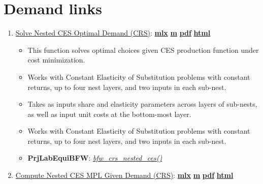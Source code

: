 \documentclass[
]{book}
\providecommand{\tightlist}{%
  \setlength{\itemsep}{0pt}\setlength{\parskip}{0pt}}
\begin{document}
\hypertarget{demand-links}{%
\section{Demand links}\label{demand-links}}

\begin{enumerate}
\def\labelenumi{\arabic{enumi}.}
\tightlist
\item
  \href{https://fanwangecon.github.io/PrjLabEquiBFW/PrjLabEquiBFW/doc/solvedemand/htmlpdfm/bfwx_crs_nested_ces.html}{Solve Nested CES Optimal Demand (CRS)}: \href{https://github.com/FanWangEcon/PrjLabEquiBFW/blob/main/PrjLabEquiBFW/doc/solvedemand/bfwx_crs_nested_ces.mlx}{\textbf{mlx}} \textbar{} \href{https://github.com/FanWangEcon/PrjLabEquiBFW/blob/main/PrjLabEquiBFW/doc/solvedemand/htmlpdfm/bfwx_crs_nested_ces.m}{\textbf{m}} \textbar{} \href{https://github.com/FanWangEcon/PrjLabEquiBFW/blob/main/PrjLabEquiBFW/doc/solvedemand/htmlpdfm/bfwx_crs_nested_ces.pdf}{\textbf{pdf}} \textbar{} \href{https://fanwangecon.github.io/PrjLabEquiBFW/PrjLabEquiBFW/doc/solvedemand/htmlpdfm/bfwx_crs_nested_ces.html}{\textbf{html}}

  \begin{itemize}
  \tightlist
  \item
    This function solves optimal choices given CES production function under cost minimization.
  \item
    Works with Constant Elasticity of Substitution problems with constant returns, up to four nest layers, and two inputs in each sub-nest.
  \item
    Takes as inputs share and elasticity parameters across layers of sub-nests, as well as input unit costs at the bottom-most layer.
  \item
    Works with Constant Elasticity of Substitution problems with constant returns, up to four nest layers, and two inputs in each sub-nest.
  \item
    \textbf{PrjLabEquiBFW}: \emph{\href{https://github.com/FanWangEcon/PrjLabEquiBFW/blob/main/PrjLabEquiBFW/solvedemand/bfw_crs_nested_ces.m}{bfw\_crs\_nested\_ces()}}
  \end{itemize}
\item
  \href{https://fanwangecon.github.io/PrjLabEquiBFW/PrjLabEquiBFW/doc/solvedemand/htmlpdfm/bfwx_crs_nested_ces_mpl.html}{Compute Nested CES MPL Given Demand (CRS)}: \href{https://github.com/FanWangEcon/PrjLabEquiBFW/blob/main/PrjLabEquiBFW/doc/solvedemand/bfwx_crs_nested_ces_mpl.mlx}{\textbf{mlx}} \textbar{} \href{https://github.com/FanWangEcon/PrjLabEquiBFW/blob/main/PrjLabEquiBFW/doc/solvedemand/htmlpdfm/bfwx_crs_nested_ces_mpl.m}{\textbf{m}} \textbar{} \href{https://github.com/FanWangEcon/PrjLabEquiBFW/blob/main/PrjLabEquiBFW/doc/solvedemand/htmlpdfm/bfwx_crs_nested_ces_mpl.pdf}{\textbf{pdf}} \textbar{} \href{https://fanwangecon.github.io/PrjLabEquiBFW/PrjLabEquiBFW/doc/solvedemand/htmlpdfm/bfwx_crs_nested_ces_mpl.html}{\textbf{html}}


\end{enumerate}
\end{document}
